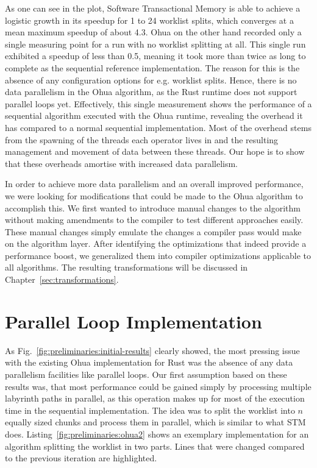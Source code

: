 As one can see in the plot, Software Transactional Memory is able to achieve a logistic growth in its speedup for 1 to 24 worklist splits, which converges at a mean maximum speedup of about 4.3.
Ohua on the other hand recorded only a single measuring point for a run with no worklist splitting at all.
This single run exhibited a speedup of less than 0.5, meaning it took more than twice as long to complete as the sequential reference implementation.
The reason for this is the absence of any configuration options for e.g. worklist splits.
Hence, there is no data parallelism in the Ohua algorithm, as the Rust runtime does not support parallel loops yet.
Effectively, this single measurement shows the performance of a sequential algorithm executed with the Ohua runtime, revealing the overhead it has compared to a normal sequential implementation.
Most of the overhead stems from the spawning of the threads each operator lives in and the resulting management and movement of data between these threads.
Our hope is to show that these overheads amortise with increased data parallelism.

In order to achieve more data parallelism and an overall improved performance, we were looking for modifications that could be made to the Ohua algorithm to accomplish this.
We first wanted to introduce manual changes to the algorithm without making amendments to the compiler to test different approaches easily.
These manual changes simply emulate the changes a compiler pass would make on the algorithm layer.
After identifying the optimizations that indeed provide a performance boost, we generalized them into compiler optimizations applicable to all algorithms.
The resulting transformations will be discussed in Chapter~\ref{sec:transformations}.


\section{Parallel Loop Implementation}%
\label{sec:preliminary:tf1}

As Fig.~\ref{fig:preliminaries:initial-results} clearly showed, the most pressing issue with the existing Ohua implementation for Rust was the absence of any data parallelism facilities like parallel loops.
Our first assumption based on these results was, that most performance could be gained simply by processing multiple labyrinth paths in parallel, as this operation makes up for most of the execution time in the sequential implementation.
The idea was to split the worklist into $n$ equally sized chunks and process them in parallel, which is similar to what STM does.
Listing~\ref{fig:preliminaries:ohua2} shows an exemplary implementation for an algorithm splitting the worklist in two parts.
Lines that were changed compared to the previous iteration are highlighted.


